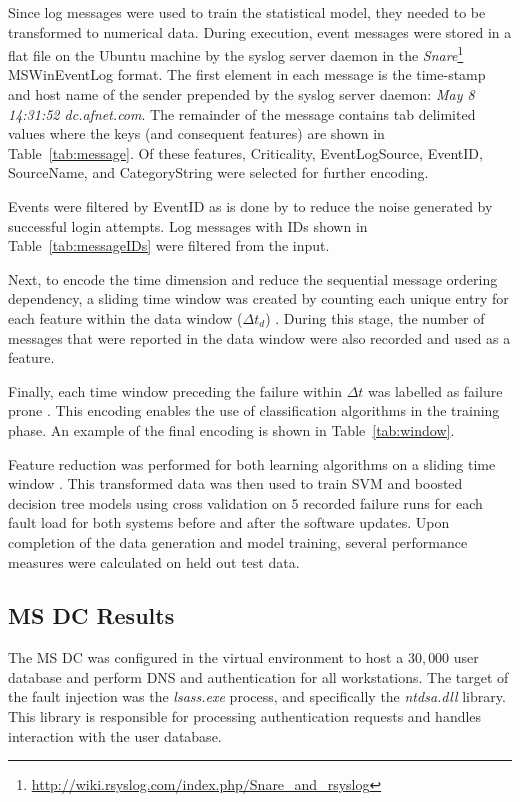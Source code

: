 Since log messages were used to train the statistical model, they needed to be
transformed to numerical data.  During execution, event messages were stored in
a flat file on the Ubuntu machine by the syslog server daemon in the
\emph{Snare}\footnote{\url{http://wiki.rsyslog.com/index.php/Snare\_and\_rsyslog}}
MSWinEventLog format.  The first element in each message is the time-stamp and
host name of the sender prepended by the syslog server daemon: \emph{May 8
14:31:52 dc.afnet.com}.  The remainder of the message contains tab delimited
values where the keys (and consequent features) are shown in
Table~\ref{tab:message}.  Of these features, Criticality, EventLogSource,
EventID, SourceName, and CategoryString were selected for further encoding.

\tabMessage

Events were filtered by EventID as is done by \citet{fulp2008} to reduce the
noise generated by successful login attempts.  Log messages with IDs shown in
Table~\ref{tab:messageIDs} were filtered from the input.  

Next, to encode the time dimension and reduce the sequential message ordering
dependency, a sliding time window was created by counting each unique entry for
each feature within the data window ($\Delta t_d$) \citep{vaarandi2002}.
During this stage, the number of messages that were reported in the data window
were also recorded and used as a feature.

Finally, each time window preceding the failure within $\Delta t$ was labelled
as failure prone \citep{irrera2015}.  This encoding enables the use of
classification algorithms in the training phase.  An example of the final
encoding is shown in Table~\ref{tab:window}.

\tabMessageIDs %
\tabSlidingWindow

Feature reduction was performed for both learning algorithms on a sliding time
window \citep{fulp2008,irrera2013a,vaarandi2002}.  This transformed data was
then used to train \ac{SVM} and boosted decision tree models using cross
validation on $5$ recorded failure runs for each fault load for both systems
before and after the software updates.  Upon completion of the data generation
and model training, several performance measures were calculated on held out
test data.

\subsection{\acrfull{MS} \acrfull{DC} Results}
The \ac{MS} \ac{DC} was configured in the virtual environment to host a
$30,000$ user database and perform \ac{DNS} and authentication for all
workstations.  The target of the fault injection was the \emph{lsass.exe}
process, and specifically the \emph{ntdsa.dll} library.  This library is
responsible for processing authentication requests and handles interaction with
the user database.

